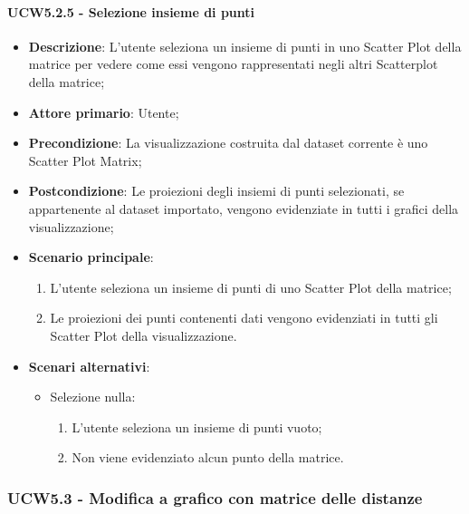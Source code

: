 \paragraph{UCW5.2.5 - Selezione insieme di punti}
\label{par:ucw5.2.5}
\begin{itemize}
    \item \textbf{Descrizione}: L'utente seleziona un insieme di punti in uno Scatter Plot della matrice per vedere come
          essi vengono rappresentati negli altri Scatterplot della matrice;

    \item \textbf{Attore primario}: Utente;

    \item \textbf{Precondizione}:   La visualizzazione costruita dal dataset corrente è uno Scatter Plot Matrix;
    \item \textbf{Postcondizione}:  Le proiezioni degli insiemi di punti selezionati, se appartenente al dataset importato,
          vengono evidenziate in tutti i grafici della visualizzazione;

    \item \textbf{Scenario principale}:
          \begin{enumerate}
              \item L'utente seleziona un insieme di punti di uno Scatter Plot della matrice;
              \item Le proiezioni dei punti contenenti dati vengono evidenziati in tutti gli Scatter Plot della visualizzazione.
          \end{enumerate}

    \item \textbf{Scenari alternativi}:
          \begin{itemize}
              \item Selezione nulla:
                    \begin{enumerate}
                        \item L'utente seleziona un insieme di punti vuoto;
                        \item Non viene evidenziato alcun punto della matrice.
                    \end{enumerate}
          \end{itemize}

\end{itemize}

\newpage
\subsubsection{UCW5.3 - Modifica a grafico con matrice delle distanze}
\label{ssub:ucw5.3}

